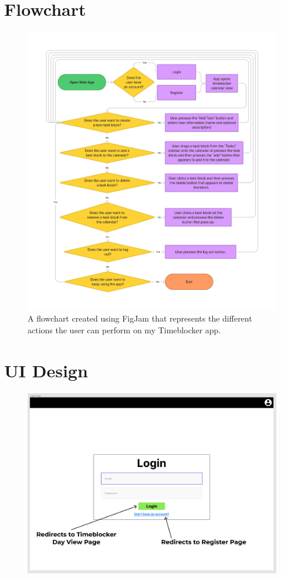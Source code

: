 \documentclass[12pt]{report}
\begin{document}
\section*{Flowchart}
\begin{figure}[H]
	\caption{A flowchart created using FigJam that represents the different actions the user can perform on my Timeblocker app.}
	\includegraphics[width=\textwidth]{flowchart.png}
\end{figure}

\section*{UI Design}
\begin{figure}[H]
\includegraphics[width=\textwidth]{login-page.png}
\end{figure}
\end{document}
